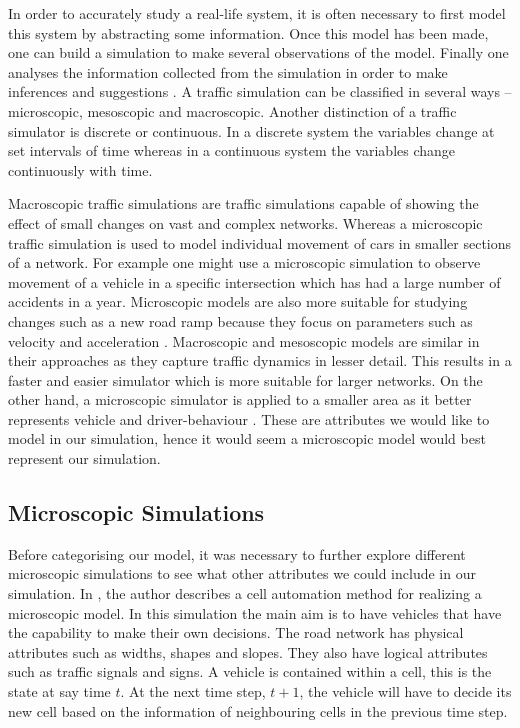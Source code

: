 \documentclass{article}
\begin{document}
	In order to accurately study a real-life system, it is often necessary to first model this system by abstracting some information. 
	Once this model has been made, one can build a simulation to make several observations of the model. 
	Finally one analyses the information collected from the simulation in order to make inferences and suggestions \cite{sokolowski2011principles}. 
	A traffic simulation can be classified in several ways -- microscopic, mesoscopic and macroscopic. 
	Another distinction of a traffic simulator is discrete or continuous. 
	In a discrete system the variables change at set intervals of time whereas in a continuous system the variables change continuously with time. 
	
	Macroscopic traffic simulations are traffic simulations capable of showing the effect of small changes on vast and complex networks. 
	Whereas a microscopic traffic simulation is used to model individual movement of cars  in smaller sections of a network. 
	For example one might use a microscopic simulation to observe movement of a vehicle in a specific intersection which has had a large number of accidents in a year. 
	Microscopic models are also more suitable for studying changes such as a new road ramp because they focus on parameters such as velocity and acceleration \cite{sokolowski2011principles}. 
	Macroscopic and mesoscopic models are similar in their approaches as they capture traffic dynamics in lesser detail. 
	This results in a faster and easier simulator which is more suitable for larger networks. 
	On the other hand, a microscopic simulator is applied to a smaller area as it better represents vehicle and driver-behaviour \cite{burghout2005hybrid}. 
	These are attributes we would like to model in our simulation, hence it would seem a microscopic model would best represent our simulation. 
	
	
	\subsection{Microscopic Simulations}\label{LiteratureReview}
	
	Before categorising our model, it was necessary to further explore different microscopic simulations to see what other attributes we could include in our simulation.
	In \cite{namekawa2005general}, the author describes a cell automation method for realizing a microscopic model. 
	In this simulation the main aim is to have vehicles that have the capability to make their own decisions. 
	The road network has physical attributes such as widths, shapes and slopes. 
	They also have logical attributes such as traffic signals and signs. 
	A vehicle is contained within a cell, this is the state at say time $t$. 
	At the next time step, $t+1$, the vehicle will have to decide its new cell based on the information of neighbouring cells in the previous time step. 
	
\end{document}

